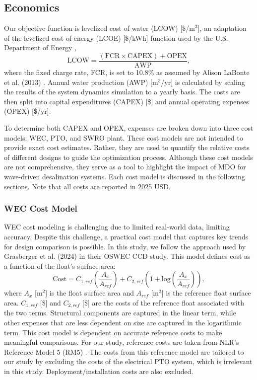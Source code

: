 \documentclass[a4paper,12pt]{elsarticle}
\begin{document}
\subsection{Economics} \label{sec:econ}
Our objective function is levelized cost of water (LCOW) [\$/m$^3$], an adaptation of the levelized cost of energy (LCOE) [\$/kWh] function used by the U.S. Department of Energy \cite{LCOE_DOE}, 
\begin{equation}
    \text{LCOW} = \frac{(\text{FCR}\times\text{CAPEX}) + \text{OPEX}}{\text{AWP}},
    \label{eq:LCOW}
\end{equation}
\noindent where the fixed charge rate, FCR, is set to 10.8\% as assumed by Alison LaBonte et al. (2013) \cite{LCOE_DOE}. Annual water production (AWP) [m$^3$/yr] is calculated by scaling the results of the system dynamics simulation to a yearly basis. The costs are then split into capital expenditures (CAPEX) [\$] and annual operating expenses (OPEX) [\$/yr].

To determine both CAPEX and OPEX, expenses are broken down into three cost models: WEC, PTO, and SWRO plant. These cost models are not intended to provide exact cost estimates. Rather, they are used to quantify the relative costs of different designs to guide the optimization process. Although these cost models are not comprehensive, they serve as a tool to highlight the impact of MDO for wave-driven desalination systems. Each cost model is discussed in the following sections. Note that all costs are reported in 2025 USD.

\subsubsection{WEC Cost Model}
WEC cost modeling is challenging due to limited real-world data, limiting accuracy. Despite this challenge, a practical cost model that captures key trends for design comparison is possible. In this study, we follow the approach used by Grasberger et al. (2024) \cite{Grasberger2024} in their OSWEC CCD study. This model defines cost as a function of the float's surface area:
\begin{equation}
    \text{Cost} = C_{1,ref}\left(\frac{A_{x}}{A_{ref}}\right) + C_{2,ref}\left(1 + \text{log}\left(\frac{A_{x}}{A_{ref}}\right)\right),
\end{equation}
\noindent where $A_{x}$ [m$^2$] is the float surface area and $A_{ref}$ [m$^2$] is the reference float surface area. $C_{1,ref}$ [\$] and $C_{2,ref}$ [\$] are the costs of the reference float associated with the two terms. Structural components are captured in the linear term, while other expenses that are less dependent on size are captured in the logarithmic term. This cost model is dependent on accurate reference costs to make meaningful comparisons. For our study, reference costs are taken from NLR's Reference Model 5 (RM5) \cite{rm5}. The costs from this reference model are tailored to our study by excluding the costs of the electrical PTO system, which is irrelevant in this study. Deployment/installation costs are also excluded. 
\end{document}
